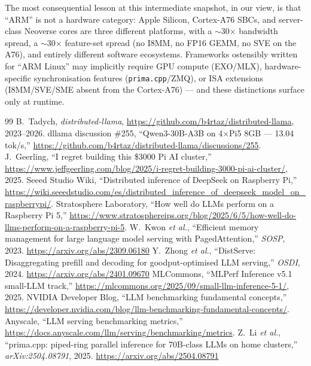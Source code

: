 \documentclass[10pt,a4paper]{article}
\begin{document}
The most consequential lesson at this intermediate snapshot, in our view, is that ``ARM'' is not a hardware category: Apple Silicon, Cortex-A76 SBCs, and server-class Neoverse cores are three different platforms, with a $\sim$30$\times$ bandwidth spread, a $\sim$30$\times$ feature-set spread (no I8MM, no FP16 GEMM, no SVE on the A76), and entirely different software ecosystems. Frameworks ostensibly written for ``ARM Linux'' may implicitly require GPU compute (EXO/MLX), hardware-specific synchronisation features (\texttt{prima.cpp}/ZMQ), or ISA extensions (I8MM/SVE/SME absent from the Cortex-A76) --- and these distinctions surface only at runtime.

\begin{thebibliography}{99}
\small
{} B.\ Tadych, \emph{distributed-llama}, \url{https://github.com/b4rtaz/distributed-llama}, 2023--2026.
 dllama discussion \#255, ``Qwen3-30B-A3B on 4×Pi5 8GB --- 13.04 tok/s,'' \url{https://github.com/b4rtaz/distributed-llama/discussions/255}.
 J.\ Geerling, ``I regret building this \$3000 Pi AI cluster,'' \url{https://www.jeffgeerling.com/blog/2025/i-regret-building-3000-pi-ai-cluster/}, 2025.
 Seeed Studio Wiki, ``Distributed inference of DeepSeek on Raspberry Pi,'' \url{https://wiki.seeedstudio.com/es/distributed_inference_of_deepseek_model_on_raspberrypi/}.
 Stratosphere Laboratory, ``How well do LLMs perform on a Raspberry Pi 5,'' \url{https://www.stratosphereips.org/blog/2025/6/5/how-well-do-llms-perform-on-a-raspberry-pi-5}.
 W.\ Kwon \emph{et al.}, ``Efficient memory management for large language model serving with PagedAttention,'' \emph{SOSP}, 2023. \url{https://arxiv.org/abs/2309.06180}
 Y.\ Zhong \emph{et al.}, ``DistServe: Disaggregating prefill and decoding for goodput-optimised LLM serving,'' \emph{OSDI}, 2024. \url{https://arxiv.org/abs/2401.09670}
 MLCommons, ``MLPerf Inference v5.1 small-LLM track,'' \url{https://mlcommons.org/2025/09/small-llm-inference-5-1/}, 2025.
 NVIDIA Developer Blog, ``LLM benchmarking fundamental concepts,'' \url{https://developer.nvidia.com/blog/llm-benchmarking-fundamental-concepts/}.
 Anyscale, ``LLM serving benchmarking metrics,'' \url{https://docs.anyscale.com/llm/serving/benchmarking/metrics}.
 Z.\ Li \emph{et al.}, ``prima.cpp: piped-ring parallel inference for 70B-class LLMs on home clusters,'' \emph{arXiv:2504.08791}, 2025. \url{https://arxiv.org/abs/2504.08791}

\end{thebibliography}
\end{document}
